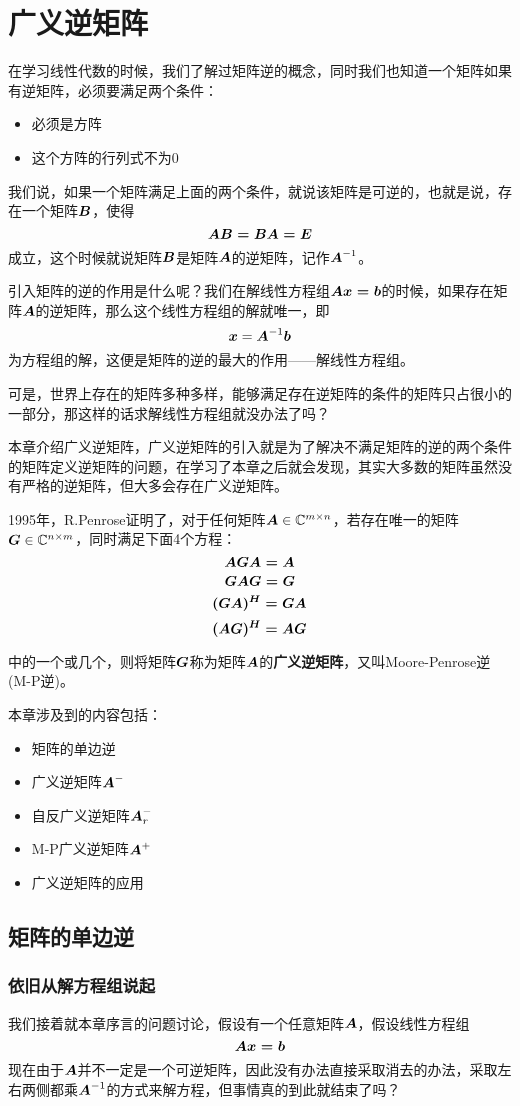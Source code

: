 \documentclass[12pt, a4paper, oneside, UTF8]{ctexbook}
\begin{document}
\else
\fi
\chapter{广义逆矩阵}
在学习线性代数的时候，我们了解过矩阵逆的概念，同时我们也知道一个矩阵如果有逆矩阵，必须要满足两个条件：
\begin{itemize}
    \item 必须是方阵
    \item 这个方阵的行列式不为0
\end{itemize}

我们说，如果一个矩阵满足上面的两个条件，就说该矩阵是可逆的，也就是说，存在一个矩阵$\boldsymbol{B}$，使得\[\boldsymbol{AB=BA=E}\]成立，这个时候就说矩阵$\boldsymbol{B}$是矩阵$\boldsymbol{A}$的逆矩阵，记作$\boldsymbol{A}^{-1}$。

引入矩阵的逆的作用是什么呢？我们在解线性方程组$\boldsymbol{Ax=b}$的时候，如果存在矩阵$\boldsymbol{A}$的逆矩阵，那么这个线性方程组的解就唯一，即\[\boldsymbol{x}=\boldsymbol{A}^{-1}\boldsymbol{b}\]为方程组的解，这便是矩阵的逆的最大的作用——解线性方程组。

可是，世界上存在的矩阵多种多样，能够满足存在逆矩阵的条件的矩阵只占很小的一部分，那这样的话求解线性方程组就没办法了吗？

本章介绍广义逆矩阵，广义逆矩阵的引入就是为了解决不满足矩阵的逆的两个条件的矩阵定义逆矩阵的问题，在学习了本章之后就会发现，其实大多数的矩阵虽然没有严格的逆矩阵，但大多会存在广义逆矩阵。

1995年，R.Penrose证明了，对于任何矩阵$\boldsymbol{A}\in \mathbb{C}^{m\times n}$，若存在唯一的矩阵$\boldsymbol{G}\in \mathbb{C}^{n\times m}$，同时满足下面4个方程：
    \[\boldsymbol{AGA=A}\]
    \[\boldsymbol{GAG=G}\]
    \[\boldsymbol{(GA)^H=GA}\]
    \[\boldsymbol{(AG)^H=AG}\]

中的一个或几个，则将矩阵$\boldsymbol{G}$称为矩阵$\boldsymbol{A}$的\textbf{广义逆矩阵}，又叫Moore-Penrose逆(M-P逆)。

本章涉及到的内容包括：
\begin{itemize}[leftmargin=4em]
    \item 矩阵的单边逆
    \item 广义逆矩阵$\boldsymbol{A}^-$
    \item 自反广义逆矩阵$\boldsymbol{A}^-_r$
    \item M-P广义逆矩阵$\boldsymbol{A}^+$
    \item 广义逆矩阵的应用
\end{itemize}

\section{矩阵的单边逆}
\subsection{依旧从解方程组说起}
我们接着就本章序言的问题讨论，假设有一个任意矩阵$\boldsymbol{A}$，假设线性方程组\[\boldsymbol{Ax=b}\]现在由于$\boldsymbol{A}$并不一定是一个可逆矩阵，因此没有办法直接采取消去的办法，采取左右两侧都乘$\boldsymbol{A}^{-1}$的方式来解方程，但事情真的到此就结束了吗？
\end{document}
